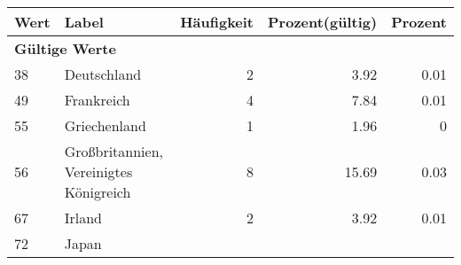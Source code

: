      \begin{longtable}{lXrrr}
     \toprule
     \textbf{Wert} & \textbf{Label} & \textbf{Häufigkeit} & \textbf{Prozent(gültig)} & \textbf{Prozent} \\
     \endhead
     \midrule
     \multicolumn{5}{l}{\textbf{Gültige Werte}}\\

     38 &
     \multicolumn{1}{X}{ Deutschland   } &


       \num{2} &
       \num[round-mode=places,round-precision=2]{3.92} &
         \num[round-mode=places,round-precision=2]{0.01} \\

     49 &
     \multicolumn{1}{X}{ Frankreich   } &


       \num{4} &
       \num[round-mode=places,round-precision=2]{7.84} &
         \num[round-mode=places,round-precision=2]{0.01} \\

     55 &
     \multicolumn{1}{X}{ Griechenland   } &


       \num{1} &
       \num[round-mode=places,round-precision=2]{1.96} &
         \num[round-mode=places,round-precision=2]{0} \\

     56 &
     \multicolumn{1}{X}{ Großbritannien, Vereinigtes Königreich   } &


       \num{8} &
       \num[round-mode=places,round-precision=2]{15.69} &
         \num[round-mode=places,round-precision=2]{0.03} \\

     67 &
     \multicolumn{1}{X}{ Irland   } &


       \num{2} &
       \num[round-mode=places,round-precision=2]{3.92} &
         \num[round-mode=places,round-precision=2]{0.01} \\

     72 &
     \multicolumn{1}{X}{ Japan   } &



\end{longtable}
